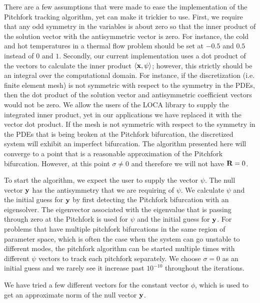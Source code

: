There are a few assumptions that were made to ease the implementation of the Pitchfork tracking algorithm, yet can make it trickier to use. First, we require that any odd symmetry in the variables is about zero so that the inner product of the solution vector with the antisymmetric vector is zero. For instance, the cold and hot temperatures in a thermal flow problem should be set at $-0.5$ and $0.5$ instead of $0$ and $1$. Secondly, our current implementation uses a dot product of the vectors to calculate the inner product $\langle {\bf x} , \psi \rangle$; however, this strictly should be an integral over the computational domain. For instance, if the discretization (i.e. finite element mesh) is not symmetric with respect to the symmetry in the PDEs, then the dot product of the solution vector and antisymmetric coefficient vectors would not be zero. We allow the users of the LOCA library to supply the integrated inner product, yet in our applications we have replaced it with the vector dot product. If the mesh is not symmetric with respect to the symmetry in the PDEs that is being broken at the Pitchfork bifurcation, the discretized system will exhibit an imperfect bifurcation. The algorithm presented here will converge to a point that is a reasonable approximation of the Pitchfork bifurcation. However, at this point $\sigma \neq 0$ and therefore we will not have ${\bf R}=0$.

To start the algorithm, we expect the user to supply the vector $\psi$. The null vector ${\bf y}$ has the antisymmetry that we are requiring of $\psi$. We calculate $\psi$ and the initial guess for ${\bf y}$ by first detecting the Pitchfork bifurcation with an eigensolver. The eigenvector associated with the eigenvalue that is passing through zero at the Pitchfork is used for $\psi$ and the initial guess for ${\bf y}$. For problems that have multiple pitchfork bifurcations in the same region of parameter space, which is often the case when the system can go unstable to different modes, the pitchfork algorithm can be started multiple times with different $\psi$ vectors to track each pitchfork separately. We choose $\sigma=0$ as an initial guess and we rarely see it increase past $10^{-10}$ throughout the iterations.

We have tried a few different vectors for the constant vector $\phi$, which is used to get an approximate norm of the null vector ${\bf y}$.

